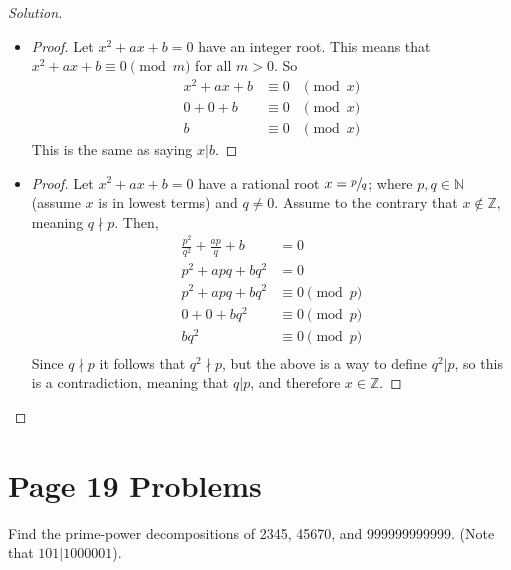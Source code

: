 \documentclass[11pt]{article}
\newcommand{\N}{\mathbb{N}}
\newcommand{\Z}{\mathbb{Z}}
\newenvironment{problem}[2][Problem]{\begin{trivlist}
\item[\hskip \labelsep {\bfseries #1}\hskip \labelsep {\bfseries #2.}]}{\end{trivlist}}
\newenvironment{solution}
  {\renewcommand\qedsymbol{$~$}\begin{proof}[Solution]$ $\par\nobreak\ignorespaces}
  {\end{proof}}
\begin{document}
\begin{solution}
  \begin{itemize}
    \item [(a)]
          \begin{proof}
            Let $x^2+ax+b=0$ have an integer root. This means that $x^2+ax+b \equiv 0 \pmod{m}$ for all $m>0$. So
            \begin{align*}
              x^2+ax+b  & \equiv 0 & \pmod{x} \\
              0 + 0 + b & \equiv 0 & \pmod{x} \\
              b         & \equiv 0 & \pmod{x}
            \end{align*}
            This is the same as saying $x|b$.
          \end{proof}
    \item [(b)]
          \begin{proof}
            Let $x^2+ax+b=0$ have a rational root $x=\sfrac{p}{q}$; where $p,q\in \N$ (assume $x$ is in lowest terms) and $q\neq 0$. Assume to the contrary that $x\notin \Z$, meaning $q\nmid p$. Then,
            \begin{align*}
              \frac{p^2}{q^2} + \frac{ap}{q} + b & = 0               \\
              p^2 + apq + bq^2                   & = 0               \\
              p^2 + apq + bq^2                   & \equiv 0 \pmod{p} \\
              0 + 0 + bq^2                       & \equiv 0 \pmod{p} \\
              bq^2                               & \equiv 0 \pmod{p} \\
            \end{align*}
            Since $q\nmid p$ it follows that $q^2\nmid p$, but the above is a way to define $q^2|p$, so this is a contradiction, meaning that $q|p$, and therefore $x\in \Z$.
          \end{proof}
  \end{itemize}
\end{solution}



\section{Page 19 Problems}



\begin{problem}{2}
Find the prime-power decompositions of 2345, 45670, and 999999999999. (Note that $101|1000001$).
\end{problem}
\end{document}
